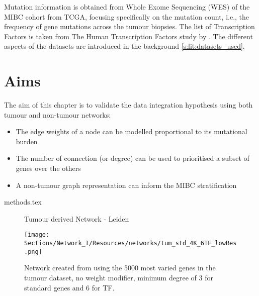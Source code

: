Mutation information is obtained from Whole Exome Sequencing (WES) of the MIBC cohort from TCGA, focusing specifically on the mutation count, i.e., the frequency of gene mutations across the tumour biopsies. The list of Transcription Factors is taken from The Human Transcription Factors study by \citet{Lambert2018-el}. The different aspects of the datasets are introduced in the background \cref{s:lit:datasets_used}.




\section{Aims}

The aim of this chapter is to validate the data integration hypothesis using both tumour and non-tumour networks:

\begin{itemize}
    \item The edge weights of a node can be modelled proportional to its mutational burden
    \item The number of connection (or degree) can be used to prioritised a subset of genes over the others
    \item A non-tumour graph representation can inform the MIBC stratification 
\end{itemize}


{methods.tex}

\newpage
{}
\begin{figure}[p]
  \thispagestyle{empty} %
  \centering
  \captionsetup{justification=centering, labelfont=bf}
    \parbox{\textwidth}{\centering \Huge Tumour derived Network - Leiden} %
  \vspace{3cm} 
    \label{fig:N_I:tum_net}
  \texttt{[image: Sections/Network\_I/Resources/networks/tum\_std\_4K\_6TF\_lowRes.png]} %
  \parbox{0.8\textwidth}{\centering Network created from using the 5000 most varied genes in the tumour dataset, no weight modifier, minimum degree of 3 for standard genes and 6 for TF.}
\end{figure}
\restoregeometry
\newpage



